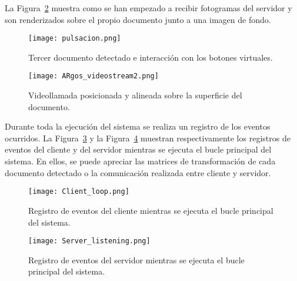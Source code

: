 La Figura~\ref{fig:ARgos_videostream2} muestra como se han empezado a recibir fotogramas del servidor y son renderizados sobre el propio documento junto a una imagen de fondo.

\begin{figure}
  \begin{center}
    \texttt{[image: pulsacion.png]}
    \caption{Tercer documento detectado e interacción con los botones virtuales.}
    \label{fig:ARgos_facture3}
  \end{center}
\end{figure}

\begin{figure}
  \begin{center}
    \texttt{[image: ARgos\_videostream2.png]}
    \caption{Videollamada posicionada y alineada sobre la superficie del documento.}
    \label{fig:ARgos_videostream2}
  \end{center}
\end{figure}

Durante toda la ejecución del sistema se realiza un registro de los eventos ocurridos. La Figura~\ref{fig:Client_loop} y la Figura~\ref{fig:Server_listening} muestran respectivamente los registros de eventos del cliente y del servidor mientras se ejecuta el bucle principal del sistema. En ellos, se puede apreciar las matrices de transformación de cada documento detectado o la comunicación realizada entre cliente y servidor.

\begin{figure}
  \begin{center}
    \texttt{[image: Client\_loop.png]}
    \caption{Registro de eventos del cliente mientras se ejecuta el bucle principal del sistema.}
    \label{fig:Client_loop}
  \end{center}
\end{figure}

\begin{figure}
  \begin{center}
    \texttt{[image: Server\_listening.png]}
    \caption{Registro de eventos del servidor mientras se ejecuta el bucle principal del sistema.}
    \label{fig:Server_listening}
  \end{center}
\end{figure}















